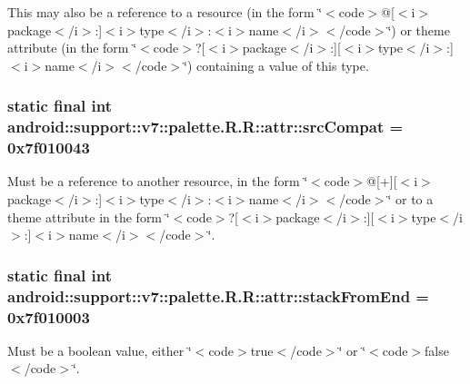 This may also be a reference to a resource (in the form \char`\"{}$<$code$>$@\mbox{[}$<$i$>$package$<$/i$>$:\mbox{]}$<$i$>$type$<$/i$>$:$<$i$>$name$<$/i$>$$<$/code$>$\char`\"{}) or theme attribute (in the form \char`\"{}$<$code$>$?\mbox{[}$<$i$>$package$<$/i$>$:\mbox{]}\mbox{[}$<$i$>$type$<$/i$>$:\mbox{]}$<$i$>$name$<$/i$>$$<$/code$>$\char`\"{}) containing a value of this type. \hypertarget{classandroid_1_1support_1_1v7_1_1palette_1_1_r_1_1attr_d9a4d8f8d7bdb405d28e21ca37b210c7}{
\subsubsection[{srcCompat}]{\setlength{\rightskip}{0pt plus 5cm}static final int android::support::v7::palette.R.R::attr::srcCompat = 0x7f010043}}
\label{classandroid_1_1support_1_1v7_1_1palette_1_1_r_1_1attr_d9a4d8f8d7bdb405d28e21ca37b210c7}


Must be a reference to another resource, in the form \char`\"{}$<$code$>$@\mbox{[}+\mbox{]}\mbox{[}$<$i$>$package$<$/i$>$:\mbox{]}$<$i$>$type$<$/i$>$:$<$i$>$name$<$/i$>$$<$/code$>$\char`\"{} or to a theme attribute in the form \char`\"{}$<$code$>$?\mbox{[}$<$i$>$package$<$/i$>$:\mbox{]}\mbox{[}$<$i$>$type$<$/i$>$:\mbox{]}$<$i$>$name$<$/i$>$$<$/code$>$\char`\"{}. \hypertarget{classandroid_1_1support_1_1v7_1_1palette_1_1_r_1_1attr_92b49481617d0343752fd7e036c19f15}{
\subsubsection[{stackFromEnd}]{\setlength{\rightskip}{0pt plus 5cm}static final int android::support::v7::palette.R.R::attr::stackFromEnd = 0x7f010003}}
\label{classandroid_1_1support_1_1v7_1_1palette_1_1_r_1_1attr_92b49481617d0343752fd7e036c19f15}


Must be a boolean value, either \char`\"{}$<$code$>$true$<$/code$>$\char`\"{} or \char`\"{}$<$code$>$false$<$/code$>$\char`\"{}. 

